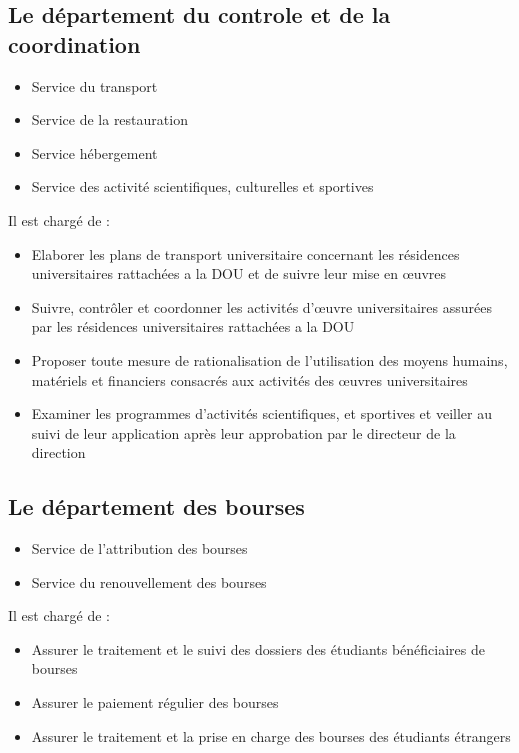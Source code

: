 \subsection{Le département du controle et de la coordination}
    \begin{itemize}
        \item Service du transport
        \item Service de la restauration
        \item Service hébergement
        \item Service des activité scientifiques, culturelles et sportives\\
    \end{itemize}

    Il est chargé de :
    \begin{itemize}
        \item Elaborer les plans de transport universitaire concernant les résidences universitaires rattachées a la DOU et de suivre leur mise en œuvres
        \item Suivre, contrôler et coordonner les activités d'œuvre universitaires     assurées par les résidences universitaires rattachées a la DOU
        \item Proposer toute mesure de rationalisation de l'utilisation des moyens   humains, matériels et financiers   consacrés   aux  activités   des   œuvres universitaires
        \item Examiner les programmes d'activités scientifiques, et sportives et veiller  au suivi de leur application après leur approbation par le directeur de la direction
    \end{itemize}

\subsection{Le département des bourses}
    \begin{itemize}
        \item Service de l'attribution des bourses
        \item Service du renouvellement des bourses\\
    \end{itemize}

    Il est chargé de :
    \begin{itemize}
        \item Assurer le traitement et le suivi des dossiers des étudiants bénéficiaires de bourses
        \item Assurer le paiement régulier des bourses
        \item Assurer le traitement et la prise en charge des bourses des étudiants étrangers
    \end{itemize}

